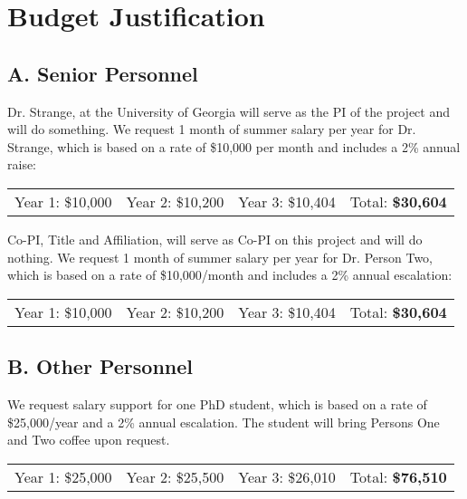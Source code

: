 \documentclass[nsfbudgjust]{nsfproposal}
\begin{document}
\section*{Budget Justification}

\subsection*{A. Senior Personnel}

 Dr. Strange, at the University of Georgia will serve as the PI of the project and will do something. We request 1 month of summer salary per year for 
Dr. Strange, which is based on a rate of \$10,000 per month and includes a 2\% annual raise:
\newline
\begin{table}[h]
	\begin{tabular}[c]{cccc}
		Year 1: \$10,000 & Year 2: \$10,200 & Year 3: \$10,404 & Total: \textbf{\$30,604}
	\end{tabular}
\end{table}
\newline
\newline
{} Co-PI, Title and Affiliation, will serve as Co-PI on this project and will do nothing. We request 1 month of summer salary per year for Dr. Person Two, which is based on a rate of \$10,000/month and includes a 2\% annual escalation:
\newline
\begin{table}[h]
\begin{tabular}[c]{cccc}
Year 1: \$10,000 & Year 2: \$10,200 & Year 3: \$10,404 & Total: \textbf{\$30,604}
\end{tabular}
\end{table}

\subsection*{B. Other Personnel}
 We request salary support for one PhD student, which is based on a rate of \$25,000/year and a 2\% annual escalation. The student will bring Persons One and Two coffee upon request.
\newline
\begin{table}[h]
\begin{tabular}[c]{cccc}
Year 1: \$25,000 & Year 2: \$25,500 & Year 3: \$26,010 & Total: \textbf{\$76,510}
\end{tabular}
\end{table}
\end{document}
